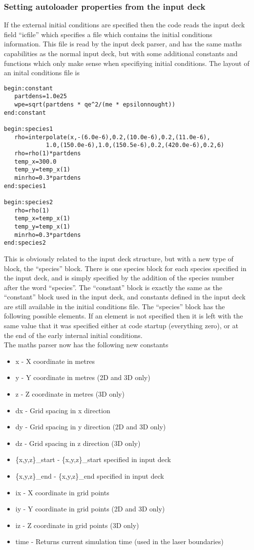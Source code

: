 \documentclass[12pt]{article}
\newcommand{\simpleboxverbatim}{\begin{Verbatim}[obeytabs=true,frame=single,
  framerule=0.5mm,rulecolor=\color{warwickmid}]}
\begin{document}
\subsubsection{Setting autoloader properties from the input deck}
If the external initial conditions are specified then the code reads the input
deck field ``icfile'' which specifies a file which contains the initial
conditions information. This file is read by the input deck parser, and has
the same maths capabilities as the normal input deck, but with some additional
constants and functions which only make sense when specifiying initial
conditions. The layout of an inital conditions file is
\simpleboxverbatim
begin:constant
   partdens=1.0e25
   wpe=sqrt(partdens * qe^2/(me * epsilonnought))
end:constant

begin:species1
   rho=interpolate(x,-(6.0e-6),0.2,(10.0e-6),0.2,(11.0e-6),
            1.0,(150.0e-6),1.0,(150.5e-6),0.2,(420.0e-6),0.2,6)
   rho=rho(1)*partdens
   temp_x=300.0
   temp_y=temp_x(1)
   minrho=0.3*partdens
end:species1

begin:species2
   rho=rho(1)
   temp_x=temp_x(1)
   temp_y=temp_x(1)
   minrho=0.3*partdens
end:species2
\end{Verbatim}

This is obviously related to the input deck structure, but with a new type of
block, the ``species'' block. There is one species block for each species
specified in the input deck, and is simply specified by the addition of the
species number after the word ``species''. The ``constant'' block is exactly
the same as the ``constant'' block used in the input deck, and constants
defined in the input deck are still available in the initial conditions
file. The ``species'' block has the following possible elements. If an element
is not specified then it is left with the same value that it was specified
either at code startup (everything zero), or at the end of the early internal
initial conditions.\\
The maths parser now has the following new constants
\begin{itemize}
\item x - X coordinate in metres
\item y - Y coordinate in metres (2D and 3D only)
\item z - Z coordinate in metres (3D only)
\item dx - Grid spacing in x direction
\item dy - Grid spacing in y direction (2D and 3D only)
\item dz - Grid spacing in z direction (3D only)
\item \{x,y,z\}\_start - \{x,y,z\}\_start specified in input deck
\item \{x,y,z\}\_end - \{x,y,z\}\_end specified in input deck
\item ix - X coordinate in grid points
\item iy - Y coordinate in grid points (2D and 3D only)
\item iz - Z coordinate in grid points (3D only)
\item time - Returns current simulation time (used in the laser boundaries)
\end{itemize}
\end{document}
